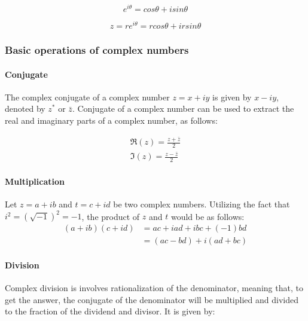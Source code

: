 \begin{equation}\label{ef}
e^{i\theta} = cos\theta+isin\theta
\end{equation}

\begin{equation}\label{eform}
 z = re^{i\theta} = rcos\theta+irsin\theta
\end{equation}




\subsubsection{Basic operations of complex numbers }
\paragraph{Conjugate}
The complex conjugate of a complex number $z=x+iy$ is given by $x-iy$, denoted by $z^{*}$ or $\bar{z}$. Conjugate of a complex number can be used to extract the real and imaginary parts of a complex number, as follows:

\begin{equation}
\begin{aligned}
\Re(z)= \frac{z+\bar{z}}{2}\\
\Im(z)= \frac{z-\bar{z}}{2}
\end{aligned}
\end{equation}

\paragraph{Multiplication}
Let $z = a+ib$ and $t=c+id$ be two complex numbers. Utilizing the fact that $i^{2}=(\sqrt{-1})^2=-1$, the product of $z$ and $t$ would be as follows:
\begin{equation}
\begin{aligned}
(a+ib)(c+id)  &= ac+iad+ibc+(-1)bd\\
&= (ac-bd)+i(ad+bc)
\end{aligned}
\end{equation}

\paragraph{Division}
Complex division is involves rationalization of the denominator, meaning that, to get the answer, the conjugate of the denominator will be multiplied and divided to the fraction of the dividend and divisor. It is given by:

